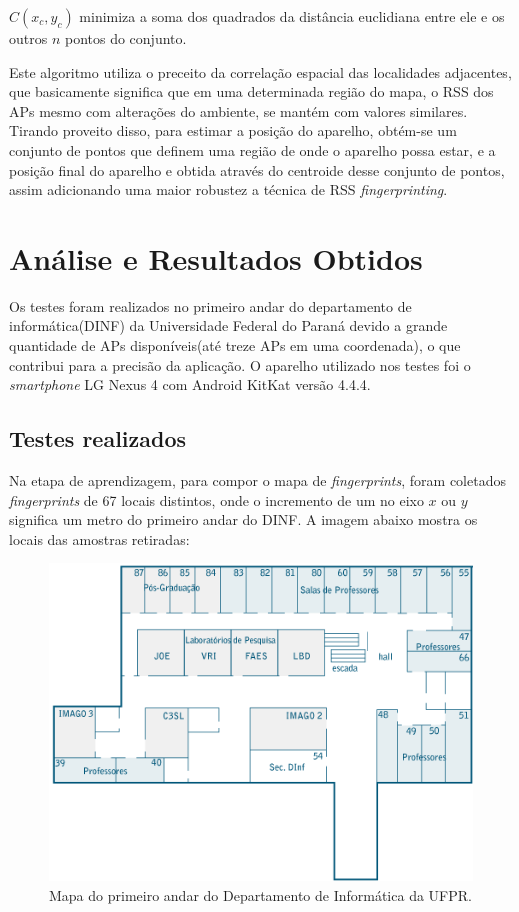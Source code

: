   $C(x_c,y_c)$ minimiza a soma dos quadrados da distância euclidiana entre ele e os outros $n$ pontos do conjunto\cite{centroid}.
  
      Este algoritmo utiliza o preceito da correlação espacial das localidades adjacentes\cite{fingerPrint2}, 
  que basicamente significa que em uma determinada região do mapa, o RSS dos APs
  mesmo com alterações do ambiente, se mantém com valores similares. Tirando proveito disso, para estimar a posição do aparelho, 
  obtém-se um conjunto de pontos que definem uma região de onde o aparelho possa estar, e a posição final do aparelho 
  e obtida através do centroide desse conjunto de pontos, assim adicionando uma maior robustez 
  a técnica de RSS \textit{fingerprinting}.
  
  \section{Análise e Resultados Obtidos}
 
  Os testes foram realizados no primeiro andar do departamento de informática(DINF) da Universidade Federal do Paraná devido a 
  grande quantidade de APs disponíveis(até treze APs em uma coordenada), o que contribui para a precisão da aplicação.
  O aparelho utilizado nos testes foi o \textit{smartphone} LG Nexus 4 com Android KitKat versão 4.4.4.
  \clearpage
  \subsection{Testes realizados}
  Na etapa de aprendizagem, para compor o mapa de \textit{fingerprints}, foram coletados \textit{fingerprints} de 67 locais distintos,
  onde o incremento de um no eixo $x$ ou $y$ significa um metro do primeiro andar do DINF. 
  A imagem abaixo mostra os locais das amostras retiradas:
   
   \begin{figure}[hbt]
  \centering
  \includegraphics[scale=0.9]{images/mapadinf_andar1_492x327.png}
  \caption{Mapa do primeiro andar do Departamento de Informática da UFPR.}
  \label{fig:mapaDinf}
  \end{figure}
     \clearpage
     
